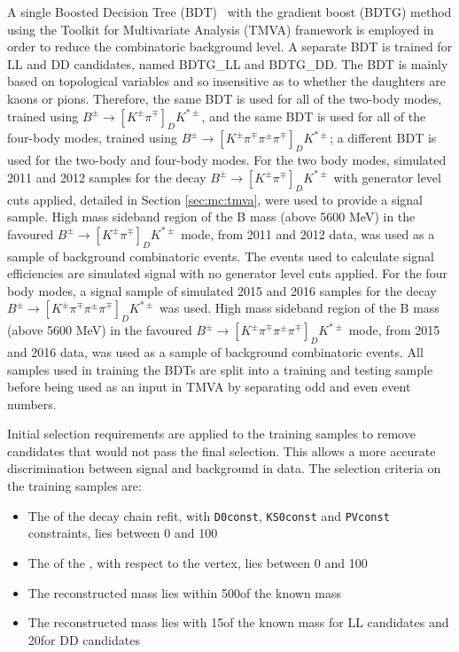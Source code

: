 A single Boosted Decision Tree (BDT)~\cite{Breiman} with the gradient boost (BDTG) method using the Toolkit for Multivariate Analysis (TMVA) framework is employed in order to reduce the combinatoric background level. A separate BDT is trained for LL and DD candidates, named BDTG\_LL and BDTG\_DD. The BDT is mainly based on topological variables and so insensitive as to whether the \D daughters are kaons or pions. Therefore, the same BDT is used for all of the two-body modes, trained using $B^{\pm} \to [K^{\pm}\pi^{\mp}]_D K^{*\pm}$, and the same BDT is used for all of the four-body modes, trained using $B^{\pm} \to [K^{\pm}\pi^{\mp}\pi^{\pm}\pi^{\mp}]_D K^{*\pm}$; a different BDT is used for the two-body and four-body modes. For the two body modes, simulated 2011 and 2012 samples for the decay $B^{\pm} \to [K^{\pm}\pi^{\mp}]_D K^{*\pm}$ with generator level cuts applied, detailed in Section \ref{sec:mc:tmva}, were used to provide a signal sample. High mass sideband region of the B mass (above 5600 MeV) in the favoured $B^{\pm} \to [K^{\pm}\pi^{\mp}]_D K^{*\pm}$ mode, from 2011 and 2012 data, was used as a sample of background combinatoric events. The events used to calculate signal efficiencies are simulated signal with no generator level cuts applied. For the four body modes, a signal sample of simulated 2015 and 2016 samples for the decay $B^{\pm} \to [K^{\pm}\pi^{\mp}\pi^{\pm}\pi^{\mp}]_D K^{*\pm}$ was used. High mass sideband region of the B mass (above 5600 MeV) in the favoured $B^{\pm} \to [K^{\pm}\pi^{\mp}\pi^{\pm}\pi^{\mp}]_D K^{*\pm}$ mode, from 2015 and 2016 data, was used as a sample of background combinatoric events. All samples used in training the BDTs are split into a training and testing sample before being used as an input in TMVA by separating odd and even event numbers.

Initial selection requirements are applied to the training samples to remove candidates that would not pass the final selection. This allows a more accurate discrimination between signal and background in data. The selection criteria on the training samples are:

\begin{itemize}
\item The \chisq of the decay chain refit, with {\tt D0const}, {\tt KS0const} and {\tt PVconst} constraints, lies between 0 and 100
\item The \chisqip of the \B, with respect to the \B vertex, lies between 0 and 100
\item The reconstructed \Kstarpm mass lies within 500\mev of the known \Kstar mass
\item The reconstructed \KS mass lies with 15\mev of the known \KS mass for LL candidates and 20\mev for DD candidates
\end{itemize}

